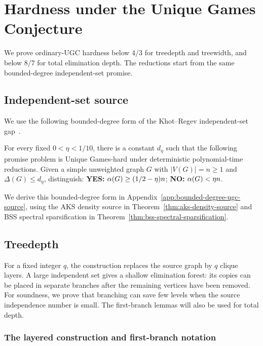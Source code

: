 \section{Hardness under the Unique Games Conjecture}
\label{sec:ugc}

We prove ordinary-UGC hardness below $4/3$ for treedepth and
treewidth, and below $8/7$ for total elimination depth. The reductions
start from the same bounded-degree independent-set promise.

\subsection{Independent-set source}
\label{subsec:ugc-source}

We use the following bounded-degree form of the Khot--Regev
independent-set gap~\cite{KhotRegev}.

\begin{theorem}
\label{thm:bounded-degree-kr-source}
For every fixed $0<\eta<1/10$, there is a constant
$d_\eta$ such that the following promise problem is Unique Games-hard
under deterministic polynomial-time reductions. Given a simple
unweighted graph $G$ with $|V(G)|=n\geq1$ and
$\Delta(G)\leq d_\eta$, distinguish:
\textbf{YES:} $\alpha(G)\geq(1/2-\eta)n$;
\textbf{NO:} $\alpha(G)<\eta n$.
\end{theorem}

We derive this bounded-degree form in
Appendix~\ref{app:bounded-degree-ugc-source}, using the AKS density
source in Theorem~\ref{thm:aks-density-source} and BSS spectral
sparsification in Theorem~\ref{thm:bss-spectral-sparsification}.

\subsection{Treedepth}
\label{subsec:ugc-treedepth}

For a fixed integer $q$, the construction replaces the source graph by
$q$ clique layers. A large independent set gives a shallow elimination forest: its copies
can be placed in separate branches after the remaining vertices have
been removed. For soundness, we prove that branching can save few
levels when the source independence number is small. The first-branch
lemmas will also be used for total depth.

\subsubsection{The layered construction and first-branch notation}
\label{subsec:ugc-layered-construction}

